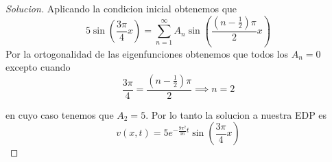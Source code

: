 \documentclass{article}
\theoremstyle{definition}
\newenvironment{solution}{\begin{proof}[Solucion]}{\end{proof}}
\begin{document}
\begin{solution}
  Aplicando la condicion inicial obtenemos que
  \begin{equation*}
    5 \sin (\frac{3\pi}{4}x) = \sum_{n = 1}^{\infty} A_{n} \sin(\frac{(n - \frac12)\pi}{2} x)
  \end{equation*}
  Por la ortogonalidad de las eigenfunciones obtenemos que todos los $A_{n} = 0$ excepto cuando
  \begin{equation*}
    \frac{3 \pi}{4} = \frac{(n - \frac{1}{2})\pi}{2} \implies n = 2
  \end{equation*}

  en cuyo caso tenemos que $A_{2} = 5$. Por lo tanto la solucion a nuestra EDP es
  \begin{equation*}
    v(x, t) = 5 e^{-\frac{9\pi^{2}}{16} t} \sin(\frac{3\pi}{4} x)
  \end{equation*}
\end{solution}
\end{document}
